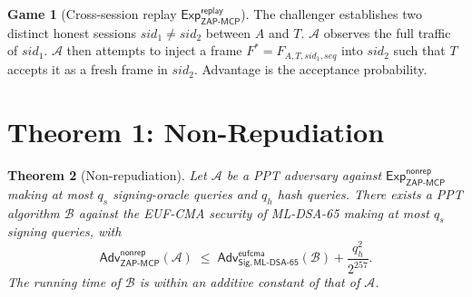 \documentclass[11pt,a4paper]{article}
\newtheorem{theorem}{Theorem}
\theoremstyle{definition}
\newtheorem{game}[theorem]{Game}
\theoremstyle{remark}
\newcommand{\zapmcp}{\textsf{ZAP-MCP}\xspace}
\newcommand{\Adv}{\mathsf{Adv}}
\newcommand{\Exp}{\mathsf{Exp}}
\newcommand{\Sign}{\textsf{Sig}}
\begin{document}
\begin{game}[Cross-session replay
$\Exp^{\mathsf{replay}}_{\zapmcp{}}$]\label{game:replay}
The challenger establishes two distinct honest sessions
$\mathit{sid}_1 \neq \mathit{sid}_2$ between $A$ and $T$. $\mathcal{A}$
observes the full traffic of $\mathit{sid}_1$. $\mathcal{A}$ then
attempts to inject a frame $F^* = F_{A,T,\mathit{sid}_1,\mathit{seq}}$
into $\mathit{sid}_2$ such that $T$ accepts it as a fresh frame in
$\mathit{sid}_2$. Advantage is the acceptance probability.
\end{game}

\section{Theorem 1: Non-Repudiation}

\begin{theorem}[Non-repudiation]\label{thm:nonrep}
Let $\mathcal{A}$ be a PPT adversary against $\Exp^{\mathsf{nonrep}}_{\zapmcp{}}$
making at most $q_s$ signing-oracle queries and $q_h$ hash queries.
There exists a PPT algorithm $\mathcal{B}$ against the EUF-CMA security
of ML-DSA-65 making at most $q_s$ signing queries, with
\[
\Adv^{\mathsf{nonrep}}_{\zapmcp{}}(\mathcal{A}) \;\leq\;
\Adv^{\mathsf{eufcma}}_{\Sign,\mathsf{ML\text{-}DSA\text{-}65}}(\mathcal{B})
+ \frac{q_h^2}{2^{257}}.
\]
The running time of $\mathcal{B}$ is within an additive constant of
that of $\mathcal{A}$.
\end{theorem}
\end{document}
